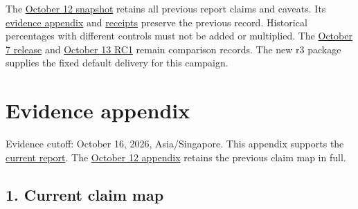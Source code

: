\documentclass[10pt,a4paper]{article}
\begin{document}
The
\href{https://github.com/MoyaMryia/riscv-accl/blob/main/spacemit/reports/snapshots/2026-10-12/SUBMISSION-REPORT.pdf}{October
12 snapshot} retains all previous report claims and caveats. Its
\href{https://github.com/MoyaMryia/riscv-accl/blob/main/spacemit/reports/snapshots/2026-10-12/SUBMISSION-EVIDENCE.md}{evidence
appendix} and
\href{https://github.com/MoyaMryia/riscv-accl/blob/main/spacemit/reports/snapshots/2026-10-12/receipts.json}{receipts}
preserve the previous record. Historical percentages with different
controls must not be added or multiplied. The
\href{https://github.com/MoyaMryia/riscv-accl/blob/main/spacemit/reports/2026-10-07-release-verification.md}{October
7 release} and
\href{https://github.com/MoyaMryia/riscv-accl/blob/main/spacemit/reports/2026-10-13-unified-release-candidate.md}{October
13 RC1} remain comparison records. The new r3 package supplies the fixed
default delivery for this campaign.

\clearpage

\hypertarget{evidence-appendix}{%
\section{Evidence appendix}\label{evidence-appendix}}

Evidence cutoff: October 16, 2026, Asia/Singapore. This appendix
supports the
\href{https://github.com/MoyaMryia/riscv-accl/blob/main/spacemit/reports/SUBMISSION-REPORT.md}{current
report}. The
\href{https://github.com/MoyaMryia/riscv-accl/blob/main/spacemit/reports/snapshots/2026-10-12/SUBMISSION-EVIDENCE.md}{October
12 appendix} retains the previous claim map in full.

\hypertarget{current-claim-map}{%
\subsection{1. Current claim map}\label{current-claim-map}}
\end{document}
